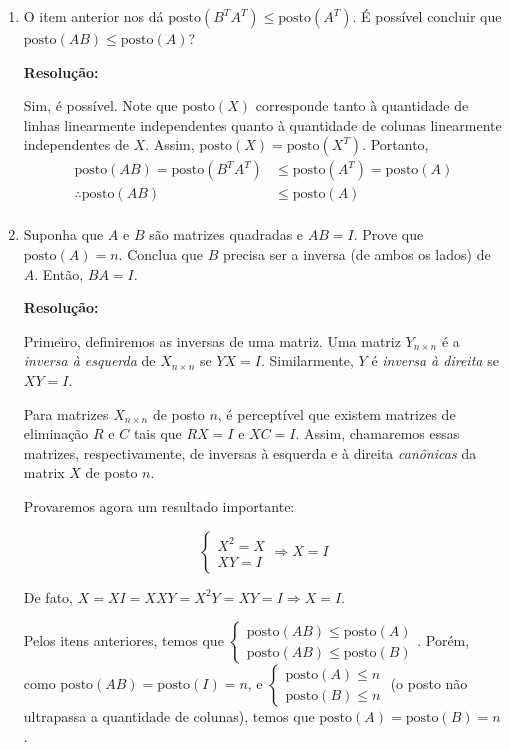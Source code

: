 \documentclass[leqno]{article}
\newcommand{\pst}[1]{\text{posto}(#1)}
\begin{document}
\begin{enumerate}
    \item O item anterior nos dá $\text{posto}(B^TA^T)\leq\text{posto}(A^T)$. É possível concluir que $\pst{AB}\leq\pst{A}$?
    
    \textbf{Resolução:}
    
    Sim, é possível. Note que $\pst{X}$ corresponde tanto à quantidade de linhas linearmente independentes quanto à quantidade de colunas linearmente independentes de $X$. Assim, $\pst{X}=\pst{X^T}$. Portanto,
    \begin{align*}
        \pst{AB}=\pst{B^TA^T}&\leq\pst{A^T}=\pst{A}\\
        \therefore \pst{AB}&\leq\pst{A}\\
    \end{align*}
    
    \item Suponha que $A$ e $B$ são matrizes quadradas e $AB=I$. Prove que $\pst{A}=n$. Conclua que $B$ precisa ser a inversa (de ambos os lados) de $A$. Então, $BA=I$.
    
    \textbf{Resolução:}
    
    Primeiro, definiremos as inversas de uma matriz. Uma matriz $Y_{n\times n}$ é a \textit{inversa à esquerda} de $X_{n\times n}$ se $YX=I$. Similarmente, $Y$ é \textit{inversa à direita} se $XY=I$.
    
    Para matrizes $X_{n\times n}$ de posto $n$, é perceptível que existem matrizes de eliminação $R$ e $C$ tais que $RX=I$ e $XC=I$. Assim, chamaremos essas matrizes, respectivamente, de inversas à esquerda e à direita \textit{canônicas} da matrix $X$ de posto $n$.
    
    Provaremos agora um resultado importante:
    
    $$\begin{cases}X^2=X\\XY=I\end{cases}\Rightarrow X=I$$
    
    De fato, $X=XI=XXY=X^2Y=XY=I\Rightarrow X=I$.
    
    Pelos itens anteriores, temos que $\begin{cases}\pst{AB}\leq\pst{A}\\\pst{AB}\leq\pst{B}\end{cases}$. Porém, como $\pst{AB}=\pst{I}=n$, e $\begin{cases}\pst{A}\leq n\\\pst{B}\leq n\end{cases}$ (o posto não ultrapassa a quantidade de colunas), temos que $\pst{A}=\pst{B}=n$.
    

\end{enumerate}
\end{document}
